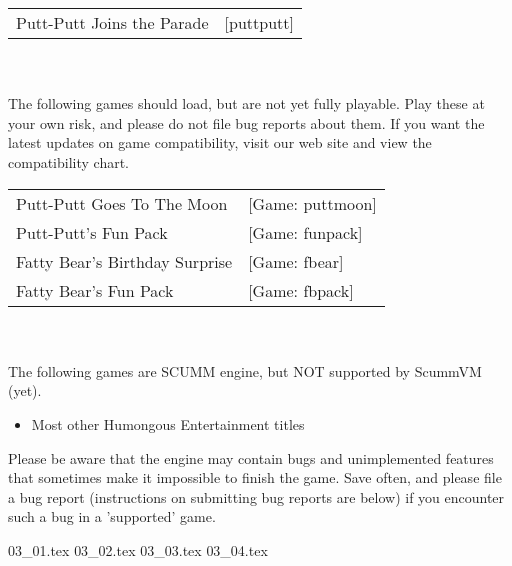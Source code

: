 \begin{itemize}
  \begin{tabular}[h]{ll}
	Putt-Putt Joins the Parade& [puttputt]\\
  \end{tabular}\\
\quad \\
  The following games should load, but are not yet fully playable. Play these at your own risk, and please do not file bug reports about them. If you want
the latest updates on game compatibility, visit our web site and view the
compatibility chart.\\

\begin{tabular}{ll}
  Putt-Putt Goes To The Moon&                    [Game: puttmoon]\\
  Putt-Putt's Fun Pack&                          [Game: funpack]\\
  Fatty Bear's Birthday Surprise&                [Game: fbear]\\
  Fatty Bear's Fun Pack&                         [Game: fbpack]\\
\end{tabular}\\
\quad \\
  The following games are SCUMM engine, but NOT supported by ScummVM (yet).\\
  \begin{itemize}
  \item Most other Humongous Entertainment titles
  \end{itemize}
%
Please be aware that the engine may contain bugs and unimplemented features
that sometimes make it impossible to finish the game. Save often, and please
file a bug report (instructions on submitting bug reports are below) if you
encounter such a bug in a 'supported' game.
\end{itemize}
 {03_01.tex}
 {03_02.tex}
 {03_03.tex}
 {03_04.tex}



